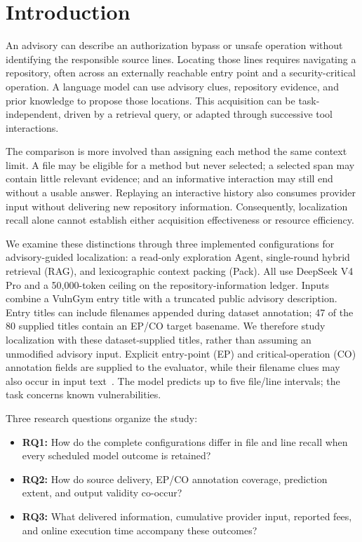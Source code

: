 \section{Introduction}
An advisory can describe an authorization bypass or unsafe operation without identifying the responsible source lines. Locating those lines requires navigating a repository, often across an externally reachable entry point and a security-critical operation. A language model can use advisory clues, repository evidence, and prior knowledge to propose those locations. This acquisition can be task-independent, driven by a retrieval query, or adapted through successive tool interactions.

The comparison is more involved than assigning each method the same context limit. A file may be eligible for a method but never selected; a selected span may contain little relevant evidence; and an informative interaction may still end without a usable answer. Replaying an interactive history also consumes provider input without delivering new repository information. Consequently, localization recall alone cannot establish either acquisition effectiveness or resource efficiency.

We examine these distinctions through three implemented configurations for advisory-guided localization: a read-only exploration Agent, single-round hybrid retrieval (RAG), and lexicographic context packing (Pack). All use DeepSeek V4 Pro and a 50,000-token ceiling on the repository-information ledger. Inputs combine a VulnGym entry title with a truncated public advisory description. Entry titles can include filenames appended during dataset annotation; 47 of the 80 supplied titles contain an EP/CO target basename. We therefore study localization with these dataset-supplied titles, rather than assuming an unmodified advisory input. Explicit entry-point (EP) and critical-operation (CO) annotation fields are supplied to the evaluator, while their filename clues may also occur in input text~\cite{vulngym,vulngymdata}. The model predicts up to five file/line intervals; the task concerns known vulnerabilities.

Three research questions organize the study:
\begin{itemize}
\item \textbf{RQ1:} How do the complete configurations differ in file and line recall when every scheduled model outcome is retained?
\item \textbf{RQ2:} How do source delivery, EP/CO annotation coverage, prediction extent, and output validity co-occur?
\item \textbf{RQ3:} What delivered information, cumulative provider input, reported fees, and online execution time accompany these outcomes?
\end{itemize}

